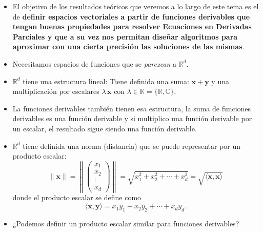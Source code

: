 \documentclass[10pt,handout]{beamer}
\theoremstyle{plain} %
\theoremstyle{plain} %
\theoremstyle{plain} %
\theoremstyle{plain} %
\theoremstyle{definition}
\theoremstyle{example}
\theoremstyle{example}
\theoremstyle{remark}
\theoremstyle{remark}
\begin{document}
\begin{frame}
\begin{itemize}
\item El objetivo de los resultados teóricos que veremos a lo largo de este tema es el de \textbf{definir espacios vectoriales a partir de funciones derivables
que tengan buenas propiedades para resolver Ecuaciones en Derivadas Parciales y que a su vez nos permitan diseñar algoritmos para aproximar con una cierta precisión las soluciones de las mismas}.
\item Necesitamos espacios de funciones que se \emph{parezcan} a $\mathbb{R}^d.$
\item $\mathbb{R}^d$ tiene una estructura lineal: Tiene definida una suma: $\mathbf{x}+\mathbf{y}$ y una multiplicación por escalares $\lambda \, \mathbf{x}$ con $\lambda \in \mathbb{K}=\{\mathbb{R},\mathbb{C}\}.$
\item La funciones derivables también tienen esa estructura, la suma de funciones derivables es una función derivable y si multiplico una función derivable por un escalar, el resultado sigue siendo una función derivable.
\end{itemize}
\end{frame}

\begin{frame}
\begin{itemize}
\item $\mathbb{R}^d$ tiene definida una norma (distancia) que se puede representar por un producto
escalar:
$$
\|\mathbf{x}\| = \left\|
\left(
\begin{array}{c}
x_1\\
x_2 \\ 
\vdots \\ 
x_d
\end{array}
\right)
\right\| = \sqrt{x_1^2+x_2^2+\cdots+ x_d^2} = \sqrt{\langle \mathbf{x},\mathbf{x} \rangle}
$$
donde el producto escalar se define como
$$
\langle \mathbf{x},\mathbf{y} \rangle = x_1y_1+x_2y_2+\cdots+x_dy_d.
$$
\item ¿Podemos definir un producto escalar similar para funciones derivables?
\end{itemize}
\end{frame}
\end{document}
